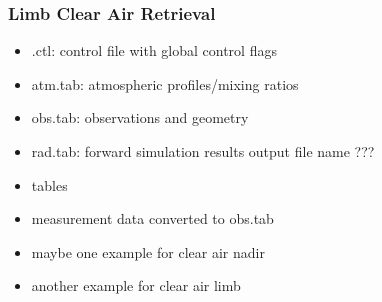 \subsubsection{Limb Clear Air Retrieval}
\begin{itemize}
\item \*.ctl: control file with global control flags
\item atm.tab: atmospheric profiles/mixing ratios
\item obs.tab: observations and geometry
\item rad.tab: forward simulation results output file name ???
\item tables
\item measurement data converted to obs.tab
\item maybe one example for clear air nadir
\item another example for clear air limb
\end{itemize}